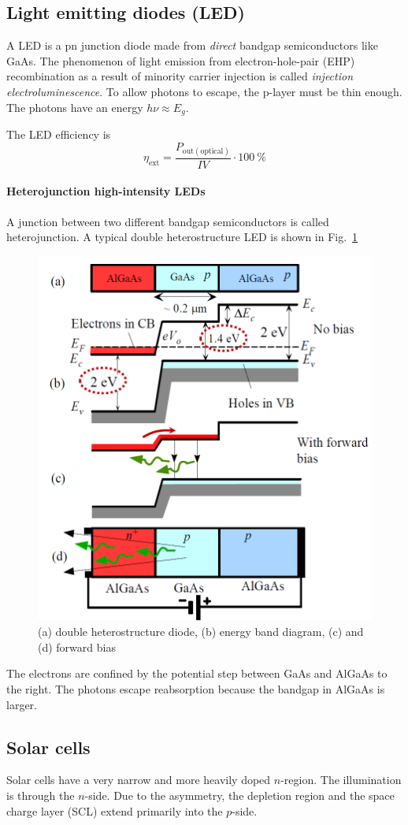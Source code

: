 \subsection{Light emitting diodes (LED)}
A LED is a pn junction diode made from \emph{direct} bandgap semiconductors like GaAs.
The phenomenon of light emission from electron-hole-pair (EHP) recombination 
as a result of minority carrier injection is called \emph{injection electroluminescence}. 
To allow photons to escape, the p-layer must be thin enough.
The photons have an energy $h\nu \approx E_g$.


The LED efficiency is 
\begin{equation}
    \eta_{\mathrm{ext}} = \frac{P_{\mathrm{out} (\text{optical})}}{I V} \cdot \SI{100}{\percent}
\end{equation}

\paragraph{Heterojunction high-intensity LEDs}
A junction between two different bandgap semiconductors is called heterojunction.
A typical double heterostructure LED is shown in Fig.~\ref{fig:heterojunction_led}

\begin{figure}[ht!]
    \centering
    \includegraphics[width=0.4\linewidth]{images/heterojunction_led.png}
    \caption{(a) double heterostructure diode, (b) energy band diagram, (c) and (d) forward bias}
    \label{fig:heterojunction_led}
\end{figure}

The electrons are confined by the potential step between GaAs and AlGaAs to the right.
The photons escape reabsorption because the bandgap in AlGaAs is larger.

\subsection{Solar cells}
Solar cells have a very narrow and more heavily doped $n$-region.
The illumination is through the $n$-side.
Due to the asymmetry, the depletion region and the space charge layer (SCL)
extend primarily into the $p$-side. 


